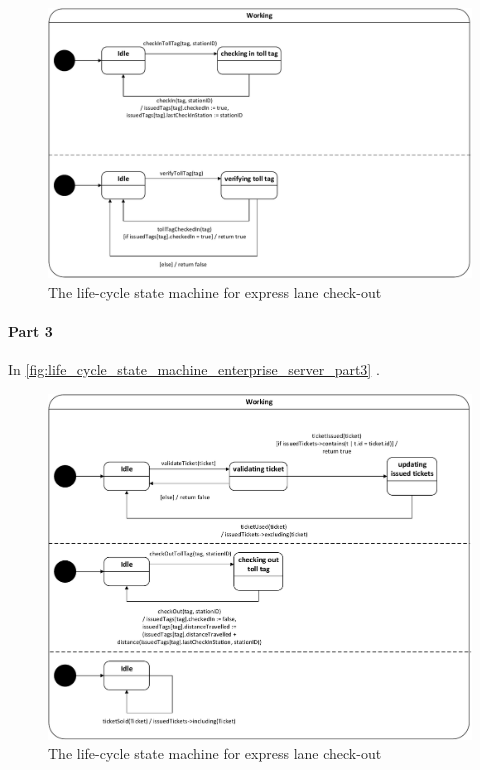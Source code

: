 \begin{figure}[H]
\centering
\includegraphics[width=0.7\linewidth]{img/behaviour_state_machines/life_cycle_state_machines/life_cycle_state_machine_enterprise_server_part2}
\caption{The life-cycle state machine for express lane check-out}
\label{fig:life_cycle_state_machine_enterprise_server_part2}
\end{figure}

\paragraph*{Part 3} In \autoref{fig:life_cycle_state_machine_enterprise_server_part3} .

\begin{figure}[H]
\centering
\includegraphics[width=0.7\linewidth]{img/behaviour_state_machines/life_cycle_state_machines/life_cycle_state_machine_enterprise_server_part3}
\caption{The life-cycle state machine for express lane check-out}
\label{fig:life_cycle_state_machine_enterprise_server_part3}
\end{figure}